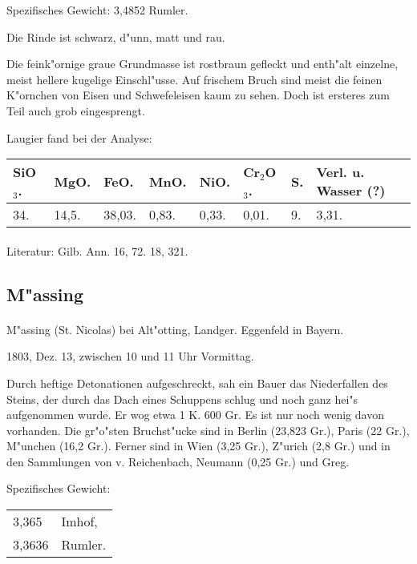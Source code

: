 \documentclass[a4paper, 11pt, oneside]{article}
\begin{document}
Spezifisches Gewicht: 3,4852 Rumler.

Die Rinde ist schwarz, d"unn, matt und rau.

Die feink"ornige graue Grundmasse ist rostbraun gefleckt und enth"alt einzelne, meist hellere kugelige Einschl"usse. Auf frischem Bruch sind meist die feinen K"ornchen von Eisen und Schwefeleisen kaum zu sehen. Doch ist ersteres zum Teil auch grob eingesprengt.

Laugier fand bei der Analyse:
\begin{table}[!ht]
    \centering
    \footnotesize
    \begin{tabular}{l l l l l l l l}
        SiO$_{3}$. & MgO. & FeO. & MnO. & NiO. & Cr$_{2}$O$_{3}$. & S. & Verl. u. Wasser (?) \\ \hline
        34. & 14,5. & 38,03. & 0,83. & 0,33. & 0,01. & 9. & 3,31. \\
    \end{tabular}
\end{table}
\footnotesize
\paragraph{}
Literatur: Gilb. Ann. 16, 72. 18, 321.
\subsection{M"assing}
\normalsize
\paragraph{}
M"assing (St. Nicolas) bei Alt"otting, Landger. Eggenfeld in Bayern.

1803, Dez. 13, zwischen 10 und 11 Uhr Vormittag.

Durch heftige Detonationen aufgeschreckt, sah ein Bauer das Niederfallen des Steins, der durch das Dach eines Schuppens schlug und noch ganz hei"s aufgenommen wurde. Er wog etwa 1 K. 600 Gr. Es ist nur noch wenig davon vorhanden. Die gr"o"sten Bruchst"ucke sind in Berlin (23,823 Gr.), Paris (22 Gr.), M"unchen (16,2 Gr.). Ferner sind in Wien (3,25 Gr.), Z"urich (2,8 Gr.) und in den Sammlungen von v. Reichenbach, Neumann (0,25 Gr.) und Greg.

Spezifisches Gewicht:
\begin{table}[!ht]
    \centering
    \begin{tabular}{l l}
        3,365 & Imhof,\\
        3,3636 & Rumler.
    \end{tabular}
\end{table}
\end{document}
